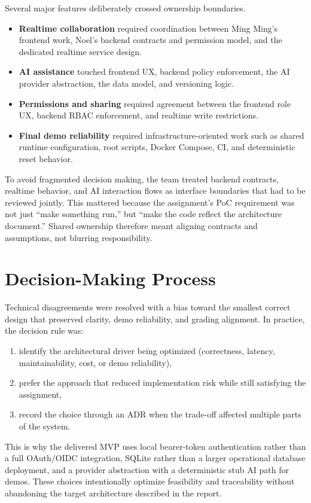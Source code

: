 Several major features deliberately crossed ownership boundaries.

\begin{itemize}
  \item \textbf{Realtime collaboration} required coordination between Ming Ming's frontend work,
  Noel's backend contracts and permission model, and the dedicated realtime service design.
  \item \textbf{AI assistance} touched frontend UX, backend policy enforcement, the AI provider
  abstraction, the data model, and versioning logic.
  \item \textbf{Permissions and sharing} required agreement between the frontend role UX, backend
  RBAC enforcement, and realtime write restrictions.
  \item \textbf{Final demo reliability} required infrastructure-oriented work such as shared runtime
  configuration, root scripts, Docker Compose, CI, and deterministic reset behavior.
\end{itemize}

To avoid fragmented decision making, the team treated backend contracts, realtime behavior, and AI
interaction flows as interface boundaries that had to be reviewed jointly. This mattered because the
assignment's PoC requirement was not just “make something run,” but “make the code reflect the
architecture document.” Shared ownership therefore meant aligning contracts and assumptions, not
blurring responsibility.

\section{Decision-Making Process}

Technical disagreements were resolved with a bias toward the smallest correct design that preserved
clarity, demo reliability, and grading alignment. In practice, the decision rule was:

\begin{enumerate}
  \item identify the architectural driver being optimized (correctness, latency, maintainability,
  cost, or demo reliability),
  \item prefer the approach that reduced implementation risk while still satisfying the assignment,
  \item record the choice through an ADR when the trade-off affected multiple parts of the system.
\end{enumerate}

This is why the delivered MVP uses local bearer-token authentication rather than a full OAuth/OIDC
 integration, SQLite rather than a larger operational database deployment, and a provider abstraction
with a deterministic stub AI path for demos. These choices intentionally optimize feasibility and
traceability without abandoning the target architecture described in the report.
